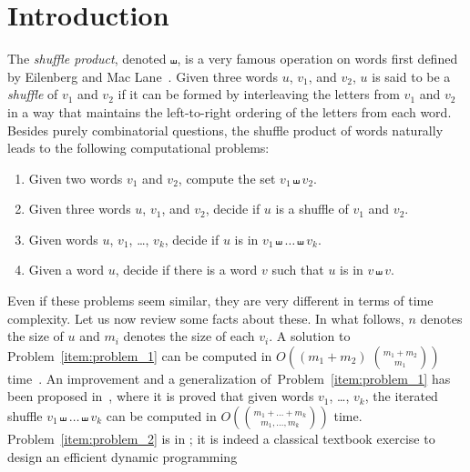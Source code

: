 \documentclass[a4paper]{llncs}
\begin{document}
\section{Introduction}
\label{section:Introduction}
The {\em shuffle product}, denoted $\shuffle$, is a very famous operation on words
first defined by Eilenberg and Mac Lane~\cite{Eilenberg:MacLane:1953}.
Given three words $u$, $v_1$, and $v_2$, $u$ is said to be a \emph{shuffle}
of $v_1$ and $v_2$ if it can be formed by interleaving the letters from
$v_1$ and $v_2$ in a way that maintains the left-to-right ordering of the
letters from each word.
Besides purely combinatorial questions,
the shuffle product of words naturally leads to the following computational
problems:
\begin{enumerate}
    \item \label{item:problem_1}
    Given two words $v_1$ and $v_2$, compute the set $v_1 \shuffle v_2$.
    \item \label{item:problem_2}
    Given three words $u$, $v_1$, and $v_2$, decide if $u$ is a shuffle
    of $v_1$ and $v_2$.
    \item \label{item:problem_3}
    Given words $u$, $v_1$, \dots, $v_k$, decide if $u$ is in
    $v_1 \shuffle \dots \shuffle v_k$.
    \item \label{item:problem_4}
    Given a word $u$, decide if there is a word $v$ such that $u$ is
    in $v \shuffle v$.
\end{enumerate}
Even if these problems seem similar, they are very different in terms
of time complexity. Let us now review some facts about these. In what follows,
$n$ denotes the size of $u$ and $m_i$ denotes the size of each $v_i$.
A solution to Problem~\ref{item:problem_1} can be computed in
$O\left((m_1 + m_2) \; \binom{m_1 + m_2}{m_1}\right)$
time~\cite{Spehner:TCS:1986}. An improvement and a generalization
of~Problem~\ref{item:problem_1} has been proposed
in~\cite{Allauzen:IGM:2000}, where it is proved that given words
$v_1$, \dots, $v_k$, the iterated shuffle
$v_1 \shuffle \dots \shuffle v_k$ can be computed in
$O\left(\binom{m_1 + \dots + m_k}{m_1, \dots, m_k}\right)$
time. Problem~\ref{item:problem_2} is in \Pclass; it is indeed a
classical textbook exercise to design an efficient dynamic programming
\end{document}
